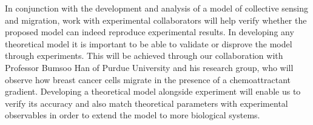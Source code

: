 In conjunction with the development and analysis of a model of collective sensing and migration, work with experimental collaborators will help verify whether the proposed model can indeed reproduce experimental results. In developing any theoretical model it is important to be able to validate or disprove the model through experiments. This will be achieved through our collaboration with Professor Bumsoo Han of Purdue University and his research group, who will observe how breast cancer cells migrate in the presence of a chemoattractant gradient. Developing a theoretical model alongside experiment will enable us to verify its accuracy and also match theoretical parameters with experimental observables in order to extend the model to more biological systems.
